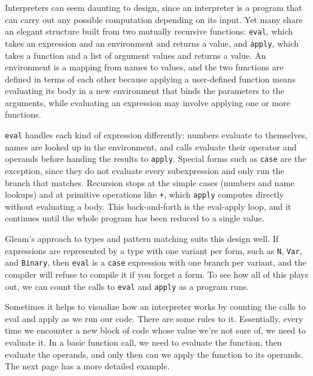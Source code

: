 Interpreters can seem daunting to design, since an interpreter is a program that can carry out any possible computation depending on its input. Yet many share an elegant structure built from two mutually recursive functions: \texttt{eval}, which takes an expression and an environment and returns a value, and \texttt{apply}, which takes a function and a list of argument values and returns a value. An environment is a mapping from names to values, and the two functions are defined in terms of each other because applying a user-defined function means evaluating its body in a new environment that binds the parameters to the arguments, while evaluating an expression may involve applying one or more functions.

\texttt{eval} handles each kind of expression differently: numbers evaluate to themselves, names are looked up in the environment, and calls evaluate their operator and operands before handing the results to \texttt{apply}. Special forms such as \texttt{case} are the exception, since they do not evaluate every subexpression and only run the branch that matches. Recursion stops at the simple cases (numbers and name lookups) and at primitive operations like \texttt{+}, which \texttt{apply} computes directly without evaluating a body. This back-and-forth is the eval-apply loop, and it continues until the whole program has been reduced to a single value.

Gleam's approach to types and pattern matching suits this design well. If expressions are represented by a type with one variant per form, such as \texttt{N}, \texttt{Var}, and \texttt{Binary}, then \texttt{eval} is a \texttt{case} expression with one branch per variant, and the compiler will refuse to compile it if you forget a form. To see how all of this plays out, we can count the calls to \texttt{eval} and \texttt{apply} as a program runs.

Sometimes it helps to visualize how an interpreter works by counting the calls to eval and apply as we run our code. There are some rules to it. Essentially, every time we encounter a new block of code whose value we're not sure of, we need to evaluate it. In a basic function call, we need to evaluate the function, then evaluate the operands, and only then can we apply the function to its operands. The next page has a more detailed example.

